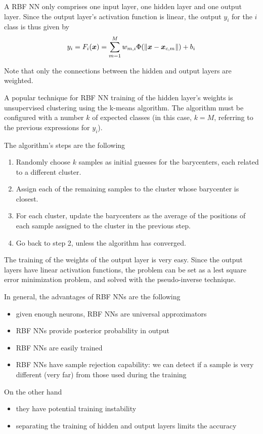 \documentclass[oneside,onecolumn]{report}
\begin{document}
A RBF NN only comprises one input layer, one hidden layer and one output layer.
Since the output layer's activation function is linear, the output $y_i$ for the $i$ class is thus given by
$$ y_i = F_i(\bm x) = \sum_{m = 1}^M w_{m, i} \Phi(\norm{\bm x - \bm x_{c,m}}) + b_i $$

Note that only the connections between the hidden and output layers are weighted.

A popular technique for RBF NN training of the hidden layer's weights is unsupervised clustering using the k-means algorithm.
The algorithm must be configured with a number $k$ of expected classes (in this case, $k = M$, referring to the previous expressions for $y_i$).

The algorithm's steps are the following
\begin{enumerate}
    \item Randomly choose $k$ samples as initial guesses for the barycenters, each related to a different cluster.
    \item Assign each of the remaining samples to the cluster whose barycenter is closest.
    \item For each cluster, update the barycenters as the average of the positions of each sample assigned to the cluster in the previous step.
    \item Go back to step 2, unless the algorithm has converged.
\end{enumerate}

The training of the weights of the output layer is very easy.
Since the output layers have linear activation functions, the problem can be set as a lest square error minimization problem, and solved with the pseudo-inverse technique.

In general, the advantages of RBF NNs are the following
\begin{itemize}
    \item given enough neurons, RBF NNs are universal approximators
    \item RBF NNs provide posterior probability in output
    \item RBF NNs are easily trained
    \item RBF NNs have sample rejection capability: we can detect if a sample is very different (very far) from those used during the training
\end{itemize}

On the other hand
\begin{itemize}
    \item they have potential training instability
    \item separating the training of hidden and output layers limits the accuracy
\end{itemize}
\end{document}
